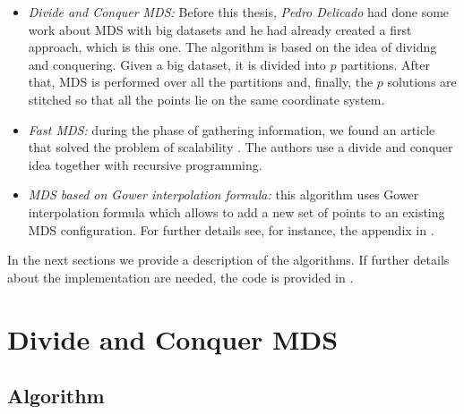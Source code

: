\documentclass[11pt]{report}
\begin{document}
\begin{itemize}
\item \textit{Divide and Conquer MDS:} Before this thesis, 
\textit{Pedro Delicado} had done some work about  MDS with big
datasets and he had already created a first approach, which is this one. The 
algorithm is based on the idea of dividng and conquering. Given a big dataset, 
it is divided into $p$ partitions. After that, MDS is performed over all the 
partitions and, finally, the $p$ solutions are stitched so that all the points 
lie on the same coordinate system.

\item \textit{Fast MDS:} during the phase of gathering information, we found an 
article that solved the problem of scalability \cite{Yang06afast}. The 
authors  use a divide and conquer idea together with recursive programming. 

\item \textit{MDS based on Gower interpolation formula:} this algorithm uses
Gower interpolation formula which allows to add a new set of points
to an existing MDS configuration. For further details see, for instance, the 
appendix in \cite{gowerHand}. 

\end{itemize}

In the next sections we provide a description of the algorithms. 
If further details about the implementation are needed, the code is provided in 
.

\section{Divide and Conquer MDS}
\subsection{Algorithm}
\end{document}
